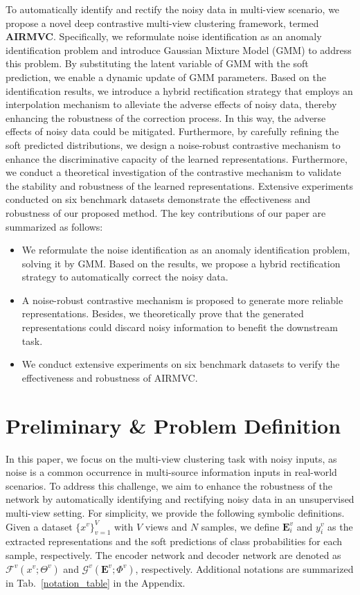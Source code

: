 \documentclass{article}
\theoremstyle{plain}
\theoremstyle{definition}
\theoremstyle{remark}
\begin{document}
To automatically identify and rectify the noisy data in multi-view scenario, we propose a novel deep contrastive multi-view clustering framework, termed \textbf{AIRMVC}. Specifically, we reformulate noise identification as an anomaly identification problem and introduce Gaussian Mixture Model (GMM) to address this problem. By substituting the latent variable of GMM with the soft prediction, we enable a dynamic update of GMM parameters. Based on the identification results, we introduce a hybrid rectification strategy that employs an interpolation mechanism to alleviate the adverse effects of noisy data, thereby enhancing the robustness of the correction process. In this way, the adverse effects of noisy data could be mitigated. Furthermore, by carefully refining the soft predicted distributions, we design a noise-robust contrastive mechanism to enhance the discriminative capacity of the learned representations. Furthermore, we conduct a theoretical investigation of the contrastive mechanism to validate the stability and robustness of the learned representations. Extensive experiments conducted on six benchmark datasets demonstrate the effectiveness and robustness of our proposed method. The key contributions of our paper are summarized as follows:
\begin{itemize}
    \item We reformulate the noise identification as an anomaly identification problem, solving it by GMM. Based on the results, we propose a hybrid rectification strategy to automatically correct the noisy data.
    
    \item A noise-robust contrastive mechanism is proposed to generate more reliable representations. Besides, we theoretically prove that the generated representations could discard noisy information to benefit the downstream task.
    
    \item We conduct extensive experiments on six benchmark datasets to verify the effectiveness and robustness of AIRMVC.
\end{itemize}




\section{Preliminary \& Problem Definition}

In this paper, we focus on the multi-view clustering task with noisy inputs, as noise is a common occurrence in multi-source information inputs in real-world scenarios. To address this challenge, we aim to enhance the robustness of the network by automatically identifying and rectifying noisy data in an unsupervised multi-view setting. For simplicity, we provide the following symbolic definitions. Given a dataset $\{x^v\}_{v=1}^{V}$ with $V$ views and $N$ samples, we define $\textbf{E}^v_i$ and $y^v_i$ as the extracted representations and the soft predictions of class probabilities for each sample, respectively. The encoder network and decoder network are denoted as $\mathcal{F}^v(x^v;\Theta^v)$ and $\mathcal{G}^v(\textbf{E}^v;\Phi^v)$, respectively. Additional notations are summarized in Tab.~\ref{notation_table} in the Appendix.
\end{document}
